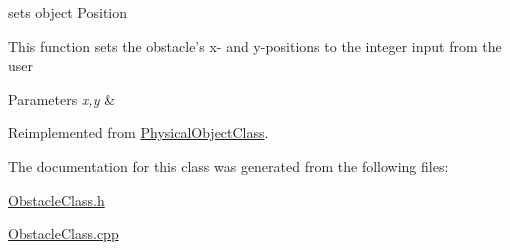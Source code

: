 sets object Position 

This function sets the obstacle's x-\/ and y-\/positions to the integer input from the user


\begin{DoxyParams}{Parameters}
{\em x,y} & \\
\hline
\end{DoxyParams}


Reimplemented from \hyperlink{classPhysicalObjectClass_a3f9833aa04aa438de63b82fc761910ba}{Physical\-Object\-Class}.



The documentation for this class was generated from the following files\-:\begin{DoxyCompactItemize}
\item 
\hyperlink{ObstacleClass_8h}{Obstacle\-Class.\-h}\item 
\hyperlink{ObstacleClass_8cpp}{Obstacle\-Class.\-cpp}\end{DoxyCompactItemize}
